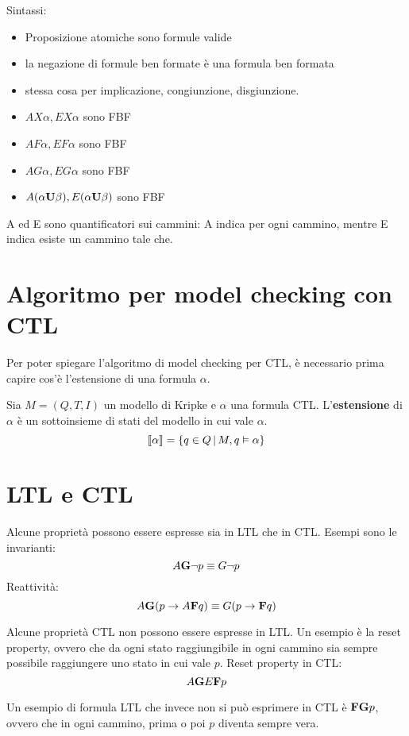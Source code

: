 Sintassi:
\begin{itemize}
    \item Proposizione atomiche sono formule valide
    \item la negazione di formule ben formate è una formula ben formata
    \item stessa cosa per implicazione, congiunzione, disgiunzione.
    \item $AX \alpha, EX \alpha$ sono FBF
    \item $AF \alpha, EF \alpha$ sono FBF
    \item $AG \alpha, EG \alpha$ sono FBF
    \item $A(\alpha \textnormal{\textbf{U}} \beta), E(\alpha \textnormal{\textbf{U}} \beta)$ sono FBF
\end{itemize}

A ed E sono quantificatori sui cammini: A indica per ogni cammino, mentre
E indica esiste un cammino tale che.

\section{Algoritmo per model checking con CTL}
Per poter spiegare l'algoritmo di model checking per CTL, è necessario prima
capire cos'è l'estensione di una formula $\alpha$.
\begin{defn}
    Sia $M = (Q, T, I)$ un modello di Kripke e $\alpha$ una formula CTL.
    L'\textbf{estensione} di $\alpha$ è un sottoinsieme di stati del modello
    in cui vale $\alpha$.
    \[
        \llbracket \alpha \rrbracket = \left\{q \in Q \,|\, M, q \vDash \alpha\right\}
    \]
\end{defn}

\section{LTL e CTL}
Alcune proprietà possono essere espresse sia in LTL che in CTL.
Esempi sono le invarianti:
\[
    A \textnormal{\textbf{G}} \lnot p \equiv G \lnot p
\]
Reattività:
\[
    A \textnormal{\textbf{G}} (p \rightarrow A \textnormal{\textbf{F}}  q) \equiv
    G (p \rightarrow \textnormal{\textbf{F}} q)
\]

Alcune proprietà CTL non possono essere espresse in LTL.
Un esempio è la reset property, ovvero che da ogni stato raggiungibile
in ogni cammino sia sempre possibile raggiungere uno stato in cui vale
$p$. Reset property in CTL:
\[
    A \textnormal{\textbf{G}} E \textnormal{\textbf{F}} p
\]

Un esempio di formula LTL che invece non si può esprimere in CTL è
$\textnormal{\textbf{F}} \textnormal{\textbf{G}} p$, ovvero che in ogni cammino, prima o poi
$p$ diventa sempre vera.


